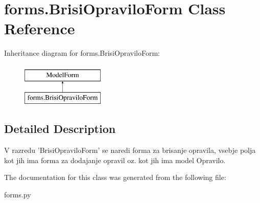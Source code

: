 \section{forms.\+Brisi\+Opravilo\+Form Class Reference}
\label{classforms_1_1_brisi_opravilo_form}
Inheritance diagram for forms.\+Brisi\+Opravilo\+Form\+:\begin{figure}[H]
\begin{center}
\leavevmode
\includegraphics[height=2.000000cm]{classforms_1_1_brisi_opravilo_form}
\end{center}
\end{figure}


\subsection{Detailed Description}
\begin{DoxyVerb}     V razredu 'BrisiOpraviloForm' se naredi forma za brisanje opravila, vsebje polja kot jih ima forma za dodajanje opravil oz. kot jih ima model Opravilo. 
\end{DoxyVerb}
 

The documentation for this class was generated from the following file\+:\begin{DoxyCompactItemize}
\item 
forms.\+py\end{DoxyCompactItemize}
